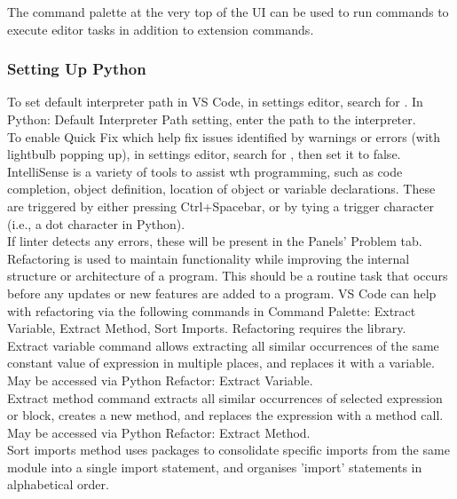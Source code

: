 The command palette at the very top of the UI can be used to run commands to execute editor tasks in addition to extension commands.\\

\subsubsection{Setting Up Python}

To set default interpreter path in VS Code, in settings editor, search for . In Python: Default Interpreter Path setting, enter the path to the interpreter.\\

To enable Quick Fix which help fix issues identified by warnings or errors (with lightbulb popping up), in settings editor, search for , then set it to false.\\

IntelliSense is a variety of tools to assist wth programming, such as code completion, object definition, location of object or variable declarations. These are triggered by either pressing Ctrl+Spacebar, or by tying a trigger character (i.e., a dot character in Python).\\

If linter detects any errors, these will be present in the Panels' Problem tab.\\

Refactoring is used to maintain functionality while improving the internal structure or architecture of a program. This should be a routine task that occurs before any updates or new features are added to a program. VS Code can help with refactoring via the following commands in Command Palette: Extract Variable, Extract Method, Sort Imports. Refactoring requires the  library.\\
Extract variable command allows extracting all similar occurrences of the same constant value of expression in multiple places, and replaces it with a variable. May be accessed via Python Refactor: Extract Variable.\\
Extract method command extracts all similar occurrences of selected expression or block, creates a new method, and replaces the expression with a method call. May be accessed via Python Refactor: Extract Method.\\
Sort imports method uses  packages to consolidate specific imports from the same module into a single import statement, and organises 'import' statements in alphabetical order.\\

